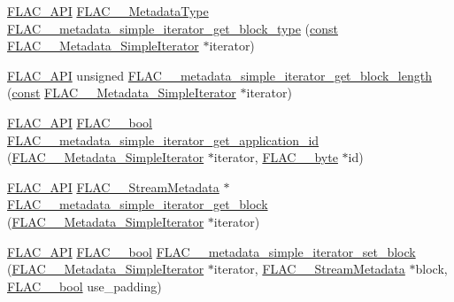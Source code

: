 \begin{DoxyCompactItemize}
\item 
\hyperlink{group__flac__export_ga56ca07df8a23310707732b1c0007d6f5}{F\+L\+A\+C\+\_\+\+A\+PI} \hyperlink{group__flac__format_gac71714ba8ddbbd66d26bb78a427fac01}{F\+L\+A\+C\+\_\+\+\_\+\+Metadata\+Type} \hyperlink{group__flac__metadata__level1_ga4649a49d230ac8bfc3ec88f5196205bb}{F\+L\+A\+C\+\_\+\+\_\+metadata\+\_\+simple\+\_\+iterator\+\_\+get\+\_\+block\+\_\+type} (\hyperlink{zconf_8h_a2c212835823e3c54a8ab6d95c652660e}{const} \hyperlink{group__flac__metadata__level1_ga6accccddbb867dfc2eece9ee3ffecb3a}{F\+L\+A\+C\+\_\+\+\_\+\+Metadata\+\_\+\+Simple\+Iterator} $\ast$iterator)
\item 
\hyperlink{group__flac__export_ga56ca07df8a23310707732b1c0007d6f5}{F\+L\+A\+C\+\_\+\+A\+PI} unsigned \hyperlink{group__flac__metadata__level1_gaad69b5d6c58c48e08dcfb3f1018c2602}{F\+L\+A\+C\+\_\+\+\_\+metadata\+\_\+simple\+\_\+iterator\+\_\+get\+\_\+block\+\_\+length} (\hyperlink{zconf_8h_a2c212835823e3c54a8ab6d95c652660e}{const} \hyperlink{group__flac__metadata__level1_ga6accccddbb867dfc2eece9ee3ffecb3a}{F\+L\+A\+C\+\_\+\+\_\+\+Metadata\+\_\+\+Simple\+Iterator} $\ast$iterator)
\item 
\hyperlink{group__flac__export_ga56ca07df8a23310707732b1c0007d6f5}{F\+L\+A\+C\+\_\+\+A\+PI} \hyperlink{ordinals_8h_a95103469f1cbd78b8cf250194985b34e}{F\+L\+A\+C\+\_\+\+\_\+bool} \hyperlink{group__flac__metadata__level1_gaf2db2a96f7c60100d620a2eefb8360bc}{F\+L\+A\+C\+\_\+\+\_\+metadata\+\_\+simple\+\_\+iterator\+\_\+get\+\_\+application\+\_\+id} (\hyperlink{group__flac__metadata__level1_ga6accccddbb867dfc2eece9ee3ffecb3a}{F\+L\+A\+C\+\_\+\+\_\+\+Metadata\+\_\+\+Simple\+Iterator} $\ast$iterator, \hyperlink{ordinals_8h_a5eb569b12d5b047cdacada4d57924ee3}{F\+L\+A\+C\+\_\+\+\_\+byte} $\ast$id)
\item 
\hyperlink{group__flac__export_ga56ca07df8a23310707732b1c0007d6f5}{F\+L\+A\+C\+\_\+\+A\+PI} \hyperlink{struct_f_l_a_c_____stream_metadata}{F\+L\+A\+C\+\_\+\+\_\+\+Stream\+Metadata} $\ast$ \hyperlink{group__flac__metadata__level1_ga31c9e013b3bdc04866eee2271349fe60}{F\+L\+A\+C\+\_\+\+\_\+metadata\+\_\+simple\+\_\+iterator\+\_\+get\+\_\+block} (\hyperlink{group__flac__metadata__level1_ga6accccddbb867dfc2eece9ee3ffecb3a}{F\+L\+A\+C\+\_\+\+\_\+\+Metadata\+\_\+\+Simple\+Iterator} $\ast$iterator)
\item 
\hyperlink{group__flac__export_ga56ca07df8a23310707732b1c0007d6f5}{F\+L\+A\+C\+\_\+\+A\+PI} \hyperlink{ordinals_8h_a95103469f1cbd78b8cf250194985b34e}{F\+L\+A\+C\+\_\+\+\_\+bool} \hyperlink{group__flac__metadata__level1_ga7d1ceb2db292c968ae6ac18ecb15c356}{F\+L\+A\+C\+\_\+\+\_\+metadata\+\_\+simple\+\_\+iterator\+\_\+set\+\_\+block} (\hyperlink{group__flac__metadata__level1_ga6accccddbb867dfc2eece9ee3ffecb3a}{F\+L\+A\+C\+\_\+\+\_\+\+Metadata\+\_\+\+Simple\+Iterator} $\ast$iterator, \hyperlink{struct_f_l_a_c_____stream_metadata}{F\+L\+A\+C\+\_\+\+\_\+\+Stream\+Metadata} $\ast$block, \hyperlink{ordinals_8h_a95103469f1cbd78b8cf250194985b34e}{F\+L\+A\+C\+\_\+\+\_\+bool} use\+\_\+padding)

\end{DoxyCompactItemize}
